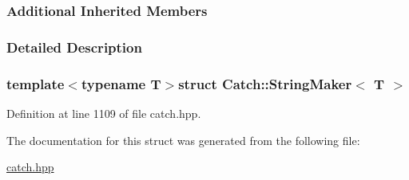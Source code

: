 \subsubsection*{Additional Inherited Members}


\subsubsection{Detailed Description}
\subsubsection*{template$<$typename T$>$struct Catch\+::\+String\+Maker$<$ T $>$}



Definition at line 1109 of file catch.\+hpp.



The documentation for this struct was generated from the following file\+:\begin{DoxyCompactItemize}
\item 
\hyperlink{a00094}{catch.\+hpp}\end{DoxyCompactItemize}

